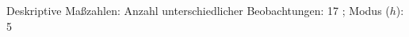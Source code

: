 				\label{tableValues:bdem07_g1}
				\vspace*{-\baselineskip}
                    \begin{noten}
                	    \note{} Deskriptive Maßzahlen:
                	    Anzahl unterschiedlicher Beobachtungen: 17%
                	    ; 
                	      Modus ($h$): 5
                     \end{noten}

